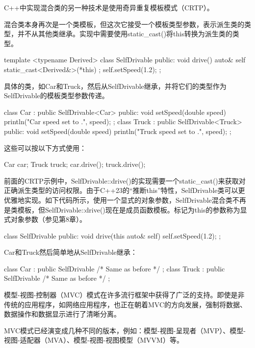 
C++中实现混合类的另一种技术是使用奇异重复模板模式（CRTP）。

混合类本身再次是一个类模板，但这次它接受一个模板类型参数，表示派生类的类型，并不从其他类继承。实现中需要使用static\_cast()将this转换为派生类的类型。

\begin{cpp}
template <typename Derived>
class SelfDrivable
{
    public:
        void drive()
        {
            auto& self { static_cast<Derived&>(*this) };
            self.setSpeed(1.2);
        }
};
\end{cpp}

具体的类，如Car和Truck，然后从SelfDrivable继承，并将它们的类型作为SelfDrivable的模板类型参数传递。

\begin{cpp}
class Car : public SelfDrivable<Car>
{
    public:
        void setSpeed(double speed) { println("Car speed set to {}.", speed); }
};
class Truck : public SelfDrivable<Truck>
{
    public:
        void setSpeed(double speed) { println("Truck speed set to {}.", speed); }
};
\end{cpp}

这些可以按以下方式使用：

\begin{shell}
Car car;
Truck truck;
car.drive();
truck.drive();
\end{shell}



前面的CRTP示例中，SelfDrivable::drive()的实现需要一个static\_cast()来获取对正确派生类型的访问权限。由于C++23的“推断this”特性，SelfDrivable类可以更优雅地实现。如下代码所示，使用一个显式的对象参数，SelfDrivable混合类不再是类模板，但SelfDrivable::drive()现在是成员函数模板。标记为this的参数称为显式对象参数（参见第8章）。

\begin{cpp}
class SelfDrivable
{
    public:
        void drive(this auto& self) { self.setSpeed(1.2); }
};
\end{cpp}

Car和Truck然后简单地从SelfDrivable继承：

\begin{cpp}
class Car : public SelfDrivable { /* Same as before */ };
class Truck : public SelfDrivable { /* Same as before */ };
\end{cpp}

模型-视图-控制器（MVC）模式在许多流行框架中获得了广泛的支持。即使是非传统的应用程序，如网络应用程序，也正在朝着MVC的方向发展，强制将数据、数据操作和数据显示进行了清晰分离。

MVC模式已经演变成几种不同的版本，例如：模型-视图-呈现者（MVP）、模型-视图-适配器（MVA）、模型-视图-视图模型（MVVM）等。





